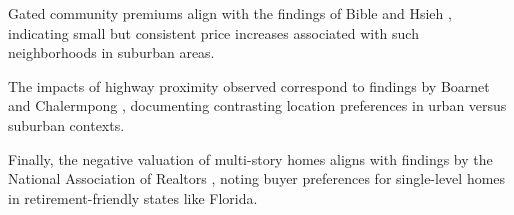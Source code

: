 Gated community premiums align with the findings of Bible and Hsieh \citep{biblhsie:2001}, indicating small but consistent price increases associated with such neighborhoods in suburban areas.

The impacts of highway proximity observed correspond to findings by Boarnet and Chalermpong \citep{boarchal:2001}, documenting contrasting location preferences in urban versus suburban contexts.

Finally, the negative valuation of multi-story homes aligns with findings by the National Association of Realtors \citep{nar:2020}, noting buyer preferences for single-level homes in retirement-friendly states like Florida.

